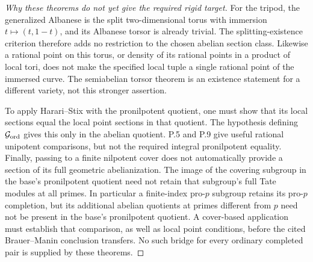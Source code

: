 \begin{proof}[Why these theorems do not yet give the required rigid target]
For the tripod, the generalized Albanese is the split two-dimensional
torus with immersion \(t\mapsto(t,1-t)\), and its Albanese torsor is
already trivial. The splitting-existence criterion therefore adds no
restriction to the chosen abelian section class. Likewise a rational
point on this torus, or density of its rational points in a product of
local tori, does not make the specified local tuple a single rational
point of the immersed curve. The semiabelian torsor theorem is an
existence statement for a different variety, not this stronger assertion.

To apply Harari--Stix with the pronilpotent quotient, one must show
that its local sections equal the local point sections in that quotient.
The hypothesis defining \(\mathcal G_{\rm ord}\) gives this only
in the abelian quotient. P.5 and P.9 give useful rational unipotent
comparisons, but not the required integral pronilpotent equality.
Finally, passing to a finite nilpotent cover does not automatically
provide a section of its full geometric abelianization. The image of
the covering subgroup in the base's pronilpotent quotient need not
retain that subgroup's full Tate modules at all primes. In particular
a finite-index pro-\(p\) subgroup retains its pro-\(p\) completion,
but its additional abelian quotients at primes different from \(p\)
need not be present in the base's pronilpotent quotient. A cover-based
application must establish that comparison, as well as local point
conditions, before the cited Brauer--Manin conclusion transfers.
No such bridge for every ordinary completed pair is supplied by these
theorems.
\end{proof}


